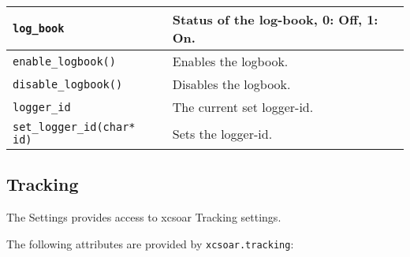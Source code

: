 \begin{maxipage}
\begin{tabularx}{1.9\textwidth}{l|X}
\hline

\verb|log_book| &  Status of the log-book, 0: Off, 1: On.\\

\hline

\verb|enable_logbook()| &  Enables the logbook.\\

\hline

\verb|disable_logbook()| &  Disables the logbook.\\

\hline

\verb|logger_id| &  The current set logger-id.\\

\hline

\verb|set_logger_id(char* id)| &  Sets the logger-id.\\

\end{tabularx}
\end{maxipage}

\subsection{Tracking}\label{sec:lua.tracking}

The Settings provides access to xcsoar Tracking settings.

The following attributes are provided by \verb|xcsoar.tracking|:


